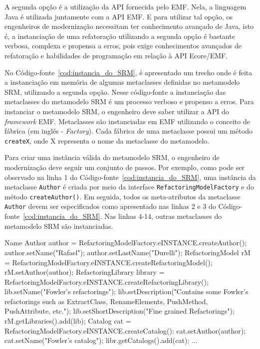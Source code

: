 A segunda opção é a utilização da API fornecida pelo EMF. Nela, a linguagem Java é utilizada juntamente com a API EMF. E para utilizar tal opção, os engenheiros de modernização necessitam ter conhecimento avançado de Java, isto é, a instanciação de uma refatoração utilizando a segunda opção é bastante verbosa, complexa e propensa a erros, pois exige conhecimentos avançados de refatoração e habilidades de programação em relação à API Ecore/EMF. 

No Código-fonte~\ref{cod:instancia_do_SRM}, é apresentado um trecho onde é feita a instanciação em memória de algumas metaclasses definidas no metamodelo SRM, utilizando a segunda opção. Nesse código-fonte a instanciação das metaclasses do metamodelo SRM é um processo verboso e propenso a erros. Para instanciar o metamodelo SRM, o engenheiro deve saber utilizar a API do \textit{framework} EMF. Metaclasses são instanciadas em EMF utilizando o conceito de fábrica (em inglês - \textit{Factory}). Cada fábrica de uma metaclasse possui um método \texttt{createX}, onde X representa o nome da metaclasse do metamodelo. 

Para criar uma instância válida do metamodelo SRM, o engenheiro de modernização deve seguir um conjunto de passos. Por exemplo, como pode ser observado na linha 1 do Código-fonte~\ref{cod:instancia_do_SRM}, uma instância da metaclasse \texttt{Author} é criada por meio da interface \texttt{RefactoringModelFactory} e do método \texttt{createAuthor()}. Em seguida, todos os meta-atributos da metaclasse \texttt{Author} devem ser especificados como apresentado nas linhas 2 e 3 do Código-fonte~\ref{cod:instancia_do_SRM}. Nas linhas 4-14, outras metaclasses do metamodelo SRM são instanciadas. 

\begin{codigo}[caption={[Instanciação do metamodelo SRM programaticamente.] Instanciação do metamodelo SRM.},escapeinside={(*@}{@*)}, basicstyle=\footnotesize, label={cod:instancia_do_SRM}, language=Java]{Name}
Author author = RefactoringModelFactory.eINSTANCE.createAuthor();
author.setName("Rafael");
author.setLastName("Durelli");
RefactoringModel rM = RefactoringModelFactory.eINSTANCE.createRefactoringModel();
rM.setAuthor(author);
RefactoringLibrary library = RefactoringModelFactory.eINSTANCE.createRefactoringLibrary();
lib.setName("Fowler's refactorings");
lib.setDescription("Contains some Fowler's refactorings such as ExtractClass, RenameElements, PushMethod, PushAttribute, etc.");
lib.setShortDescription("Fine grained Refactorings");
rM.getLibraries().add(lib);
Catalog cat = RefactoringModelFactory.eINSTANCE.createCatalog();
cat.setAuthor(author);
cat.setName("Fowler's catalog");
libr.getCatalogs().add(cat);
...
\end{codigo}

